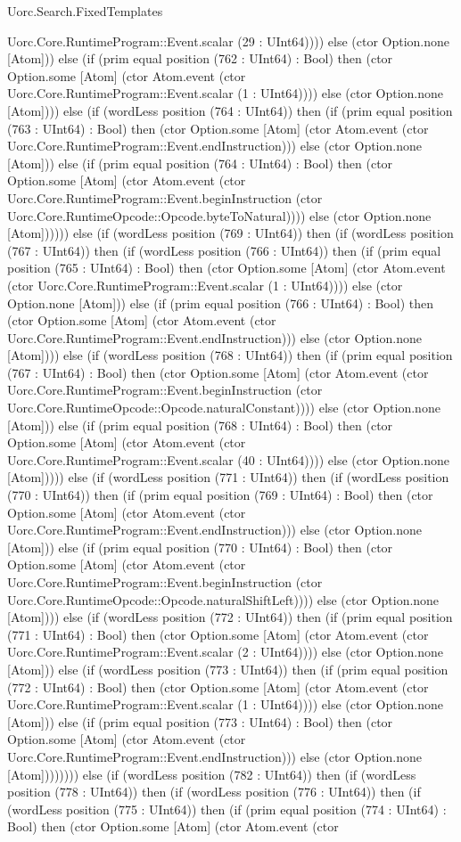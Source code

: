 \begin{lexlean}{Uorc.Search.FixedTemplates}
\begin{semanticmodule}
{Uorc.Core.RuntimeProgram::Event.scalar (29 : UInt64)))) else (ctor Option.none [Atom])) else (if (prim equal position (762 : UInt64) : Bool) then (ctor Option.some [Atom] (ctor Atom.event (ctor Uorc.Core.RuntimeProgram::Event.scalar (1 : UInt64)))) else (ctor Option.none [Atom]))) else (if (wordLess position (764 : UInt64)) then (if (prim equal position (763 : UInt64) : Bool) then (ctor Option.some [Atom] (ctor Atom.event (ctor Uorc.Core.RuntimeProgram::Event.endInstruction))) else (ctor Option.none [Atom])) else (if (prim equal position (764 : UInt64) : Bool) then (ctor Option.some [Atom] (ctor Atom.event (ctor Uorc.Core.RuntimeProgram::Event.beginInstruction (ctor Uorc.Core.RuntimeOpcode::Opcode.byteToNatural)))) else (ctor Option.none [Atom]))))) else (if (wordLess position (769 : UInt64)) then (if (wordLess position (767 : UInt64)) then (if (wordLess position (766 : UInt64)) then (if (prim equal position (765 : UInt64) : Bool) then (ctor Option.some [Atom] (ctor Atom.event (ctor Uorc.Core.RuntimeProgram::Event.scalar (1 : UInt64)))) else (ctor Option.none [Atom])) else (if (prim equal position (766 : UInt64) : Bool) then (ctor Option.some [Atom] (ctor Atom.event (ctor Uorc.Core.RuntimeProgram::Event.endInstruction))) else (ctor Option.none [Atom]))) else (if (wordLess position (768 : UInt64)) then (if (prim equal position (767 : UInt64) : Bool) then (ctor Option.some [Atom] (ctor Atom.event (ctor Uorc.Core.RuntimeProgram::Event.beginInstruction (ctor Uorc.Core.RuntimeOpcode::Opcode.naturalConstant)))) else (ctor Option.none [Atom])) else (if (prim equal position (768 : UInt64) : Bool) then (ctor Option.some [Atom] (ctor Atom.event (ctor Uorc.Core.RuntimeProgram::Event.scalar (40 : UInt64)))) else (ctor Option.none [Atom])))) else (if (wordLess position (771 : UInt64)) then (if (wordLess position (770 : UInt64)) then (if (prim equal position (769 : UInt64) : Bool) then (ctor Option.some [Atom] (ctor Atom.event (ctor Uorc.Core.RuntimeProgram::Event.endInstruction))) else (ctor Option.none [Atom])) else (if (prim equal position (770 : UInt64) : Bool) then (ctor Option.some [Atom] (ctor Atom.event (ctor Uorc.Core.RuntimeProgram::Event.beginInstruction (ctor Uorc.Core.RuntimeOpcode::Opcode.naturalShiftLeft)))) else (ctor Option.none [Atom]))) else (if (wordLess position (772 : UInt64)) then (if (prim equal position (771 : UInt64) : Bool) then (ctor Option.some [Atom] (ctor Atom.event (ctor Uorc.Core.RuntimeProgram::Event.scalar (2 : UInt64)))) else (ctor Option.none [Atom])) else (if (wordLess position (773 : UInt64)) then (if (prim equal position (772 : UInt64) : Bool) then (ctor Option.some [Atom] (ctor Atom.event (ctor Uorc.Core.RuntimeProgram::Event.scalar (1 : UInt64)))) else (ctor Option.none [Atom])) else (if (prim equal position (773 : UInt64) : Bool) then (ctor Option.some [Atom] (ctor Atom.event (ctor Uorc.Core.RuntimeProgram::Event.endInstruction))) else (ctor Option.none [Atom]))))))) else (if (wordLess position (782 : UInt64)) then (if (wordLess position (778 : UInt64)) then (if (wordLess position (776 : UInt64)) then (if (wordLess position (775 : UInt64)) then (if (prim equal position (774 : UInt64) : Bool) then (ctor Option.some [Atom] (ctor Atom.event (ctor }
\end{semanticmodule}
\end{lexlean}
